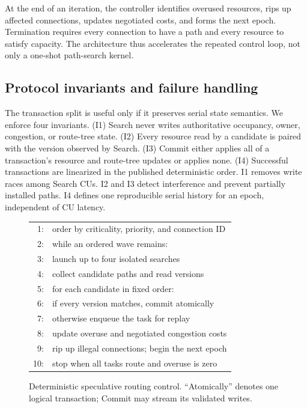 \documentclass[sigconf,anonymous,review]{acmart}
\begin{document}
At the end of an iteration, the controller identifies overused resources,
rips up affected connections, updates negotiated costs, and forms the next
epoch. Termination requires every connection to have a path and every resource
to satisfy capacity. The architecture thus accelerates the repeated control
loop, not only a one-shot path-search kernel.

\subsection{Protocol invariants and failure handling}

The transaction split is useful only if it preserves serial state semantics.
We enforce four invariants. (I1) Search never writes authoritative occupancy,
owner, congestion, or route-tree state. (I2) Every resource read by a candidate
is paired with the version observed by Search. (I3) Commit either applies all
of a transaction's resource and route-tree updates or applies none. (I4)
Successful transactions are linearized in the published deterministic order.
I1 removes write races among Search CUs. I2 and I3 detect interference and
prevent partially installed paths. I4 defines one reproducible serial history
for an epoch, independent of CU latency.

\begin{figure}[t]
\small
\begin{tabular}{@{}rl@{}}
1: & order by criticality, priority, and connection ID \\
2: & while an ordered wave remains: \\
3: & \quad launch up to four isolated searches \\
4: & \quad collect candidate paths and read versions \\
5: & \quad for each candidate in fixed order: \\
6: & \qquad if every version matches, commit atomically \\
7: & \qquad otherwise enqueue the task for replay \\
8: & update overuse and negotiated congestion costs \\
9: & rip up illegal connections; begin the next epoch \\
10: & stop when all tasks route and overuse is zero
\end{tabular}
\caption{Deterministic speculative routing control. ``Atomically'' denotes one
logical transaction; Commit may stream its validated writes.}
\label{fig:protocol}
\end{figure}
\end{document}
